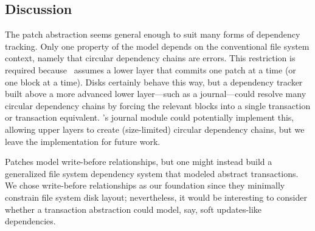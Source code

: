 


\subsection{Discussion}

The patch abstraction seems general enough to suit many forms of
 dependency tracking.
%
Only one property of the model depends on the conventional file system context,
 namely that circular dependency chains are errors.
%
This restriction is required because \Kudos\ assumes a lower layer that
 commits one patch at a time (or one block at a time).
%
Disks certainly behave this way, but a dependency tracker built above a
 more advanced lower layer---such as a journal---could resolve many
 circular dependency chains by forcing the relevant blocks into a single
 transaction or transaction equivalent.
%
\Featherstitch's journal module could potentially implement this, allowing
 upper layers to create (size-limited) circular dependency chains, but we
 leave the implementation for future work.

Patches model write-before relationships, but one might instead build a
 generalized file system dependency system that modeled abstract
 transactions.
%
We chose write-before relationships as our foundation since they minimally
 constrain file system disk layout; nevertheless, it would be interesting
 to consider whether a transaction abstraction could model, say, soft
 updates-like dependencies.
